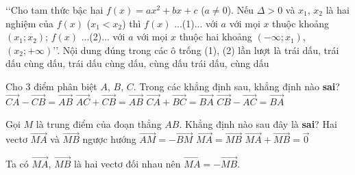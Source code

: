 \begin{ex}%
\lq\lq Cho tam thức bậc hai $f(x)=ax^2+bx+c$ ($a\neq0$). Nếu $\Delta>0$ và $x_1$, $x_2$ là hai nghiệm của $f(x)$ ($x_1<x_2$) thì $f(x)$ ...(1)... với $a$ với mọi $x$ thuộc khoảng $(x_1;x_2)$; $f(x)$ ...(2)... với $a$ với mọi $x$ thuộc hai khoảng $(-\infty;x_1)$, $(x_2;+\infty)$\rq\rq. Nội dung đúng trong các ô trống (1), (2) lần lượt là
\choice
{trái dấu, trái dấu}
{cùng dấu, trái dấu}
{cùng dấu, cùng dấu}
{\True trái dấu, cùng dấu}
\end{ex}

\begin{ex}%
Cho $3$ điểm phân biệt $A$, $B$, $C$. Trong các khẳng định sau, khẳng định nào \textbf{sai}?
\choice
{$\overrightarrow{CA}-\overrightarrow{CB}=\overrightarrow{AB}$}
{$\overrightarrow{AC}+\overrightarrow{CB}=\overrightarrow{AB}$}
{$\overrightarrow{CA}+\overrightarrow{BC}=\overrightarrow{BA}$}
{\True $\overrightarrow{CB}-\overrightarrow{AC}=\overrightarrow{BA}$}
\end{ex}

\begin{ex}%
Gọi $M$ là trung điểm của đoạn thẳng $AB$. Khẳng định nào sau đây là \textbf{sai}?
\choice
{Hai vectơ $\overrightarrow{MA}$ và $\overrightarrow{MB}$ ngược hướng}
{$\overrightarrow{AM}=-\overrightarrow{BM}$}
{\True $\overrightarrow{MA}=\overrightarrow{MB}$}
{$\overrightarrow{MA}+\overrightarrow{MB}=\overrightarrow{0}$}
\loigiai
{
\begin{center}
\end{center}
Ta có $\overrightarrow{MA}$, $\overrightarrow{MB}$ là hai vectơ đối nhau nên $\overrightarrow{MA}=-\overrightarrow{MB}$.}
\end{ex}

